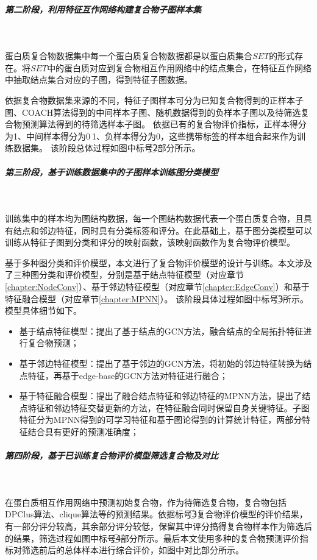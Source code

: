 \subparagraph*{第二阶段，利用特征互作网络构建复合物子图样本集} ~

蛋白质复合物数据集中每一个蛋白质复合物数据都是以蛋白质集合$SET$的形式存在。将$SET$中的蛋白质对应到复合物相互作用网络中的结点集合，在特征互作网络中抽取结点集合对应的子图，得到特征子图数据。

依据复合物数据集来源的不同，特征子图样本可分为已知复合物得到的正样本子图、COACH算法得到的中间样本子图、随机数据得到的负样本子图以及待筛选复合物预测算法得到的待筛选样本子图。
依据已有的复合物评价指标，正样本得分为1、中间样本得分为0$~$1、负样本得分为0，这些携带标签的样本组合起来作为训练数据集。
该阶段总体过程如图中标号\textcircled{2}部分所示。

\subparagraph*{第三阶段，基于训练数据集中的子图样本训练图分类模型} ~

训练集中的样本均为图结构数据，每一个图结构数据代表一个蛋白质复合物，且具有结点和邻边特征，同时具有分类标签和评分。在此基础上，基于图分类模型可以训练从特征子图到分类和评分的映射函数，该映射函数作为复合物评价模型。

基于多种图分类和评价模型，本文进行了复合物评价模型的设计与训练。本文涉及了三种图分类和评价模型，分别是基于结点特征模型（对应章节\ref{chapter:NodeConv}）、基于邻边特征模型（对应章节\ref{chapter:EdgeConv}）和基于特征融合模型（对应章节\ref{chapter:MPNN}）。
该阶段具体过程如图中标号\textcircled{3}所示。模型具体细节如下。
\begin{itemize}
  \item 基于结点特征模型：提出了基于结点的GCN方法，融合结点的全局拓扑特征进行复合物预测；
  \item 基于邻边特征模型：提出了基于邻边的GCN方法，将初始的邻边特征转换为结点特征，再基于edge-base的GCN方法对特征进行融合；
  \item 基于特征融合模型：提出了融合结点特征和邻边特征的MPNN方法，提出了结点特征和邻边特征交替更新的方法，在特征融合同时保留自身关键特征。子图特征分为MPNN得到的可学习特征和基于图论得到的计算统计特征，两部分特征结合具有更好的预测准确度；
\end{itemize}


\subparagraph*{第四阶段，基于已训练复合物评价模型筛选复合物及对比} ~

在蛋白质相互作用网络中预测初始复合物，作为待筛选复合物，复合物包括DPClus算法、clique算法等的预测结果。依据标号\textcircled{3}复合物评价模型的评价结果，有一部分评分较高，其余部分评分较低，保留其中评分搞得复合物样本作为筛选后的结果，筛选过程如图中标号\textcircled{4}部分所示。最后本文使用多种的复合物预测评价指标对筛选前后的总体样本进行综合评价，如图中对比部分所示。

